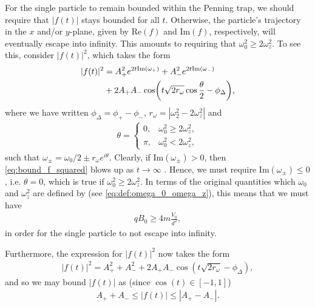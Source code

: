 \documentclass[english,notitlepage,reprint]{revtex4-2}  %
\begin{document}


For the single particle to remain bounded within the Penning trap, we should require that \(|f(t)|\) stays bounded for all \(t\). Otherwise, the particle's trajectory in the \(x\) and/or \(y\)-plane, given by \(\text{Re}(f)\) and \(\text{Im}(f)\), respectively, will eventually escape into infinity. This amounts to requiring that \(\omega_0^2 \geq 2\omega_z^2\). To see this, consider \(|f(t)|^2\), which takes the form
\begin{align}
    |f(t)|^2 &= A_+^2e^{2t\text{Im}(\omega_+)} + A_-^2e^{2t\text{Im}(\omega_-)} 
    \notag \\
    &+ 2A_{+}A_{-}\cos(t\sqrt{2r_{\omega}}\cos\frac{\theta}{2} - \phi_{\Delta}),  \label{eq:bound_f_squared}
\end{align}
where we have written \(\phi_{\Delta} = \phi_+ - \phi_-\), \(r_{\omega} = |\omega_2^2 - 2\omega_z^2|\) and 
\begin{align}
    \theta = 
    \begin{cases}
        0, &\omega_0^2 \geq 2\omega_z^2, \\
        \pi, &\omega_0^2 < 2\omega_z^2,    
    \end{cases}
\end{align}
such that \(\omega_{\pm} = \omega_0/2 \pm r_\omega e^{i\theta}\).
Clearly, if \(\text{Im}(\omega_\pm)> 0\), then \eqref{eq:bound_f_squared} blows up as \(t\rightarrow \infty\) . Hence, we must require \(\text{Im}(\omega_\pm)\leq 0\), i.e. \(\theta = 0\), which is true if \(\omega_0^2 \geq 2\omega_z^2\). In terms of the original quantities which \(\omega_0\) and \(\omega_z^2\) are defined by (see \eqref{eq:def:omega_0_omega_z}), this means that we must have 
\begin{align}
    qB_0 \geq 4m \frac{V_0}{d^2},
\end{align}
in order for the single particle to not escape into infinity.

Furthermore, the expression for \(|f(t)|^2\) now takes the form 
\begin{align}
    |f(t)|^2 = A_+^2 + A_-^2 + 2A_+A_-\cos(t\sqrt{2r_{\omega}} - \phi_{\Delta}),
\end{align}
and so we may bound \(|f(t)|\) as (since \({\cos(t)\in[-1,1]}\))
\begin{align}
    A_+ + A_- \leq |f(t)| \leq |A_+ - A_-|.
\end{align}
\end{document}
